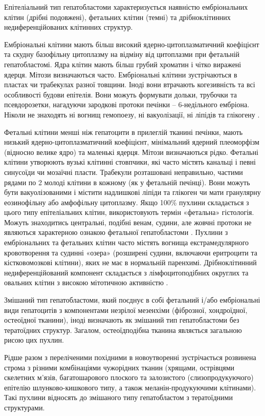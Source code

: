 Епітеліальний тип гепатобластоми характеризується наявністю ембріональних клітин (дрібні подовжені), фетальних клітин (темні) та дрібноклітинних недиференційованих клітинних структур. 

Ембріональні  клітини мають більш високий ядерно-цитоплазматичний коефіцієнт та скудну базофільну цитоплазму на відміну від цитоплазми при фетальній гепатобластомі. Ядра клітин мають більш грубий хроматин і чітко виражені ядерця. Мітози визначаються часто. Ембріональні клітини зустрічаються в пластах чи трабекулах разної товщини. Іноді  вони втрачають когезивність та всі особливості будови епітелія. Вони можуть формувати дольки, трубочки та псевдорозетки, нагадуючи зародкові протоки печінки – 6-недільного ембріона. Ніколи не знаходять ні вогнищ гемопоезу, ні вакуолізації, ні ліпідів та глікогену \cite{pmid20922397}.

Фетальні клітини менші ніж гепатоцити в прилеглій тканині печінки, мають низький ядерно-цитоплазматичний коефіцієнт, мінімальний ядерний плеоморфізм (відносно велике ядро) та маленькі ядерця. Мітози визначаються рідко. Фетальні клітини утворюють вузькі клітинні стовпчики, які часто містять канальці і певні  синусоїди чи мозаїчні пласти. Трабекули розташовані неправильно, частими рядами по 2 молоді клітини в кожному (як у фетальній печінці). Вони можуть бути вакуолізованими і містити надлишкові ліпіди та глікоген чи мати гранулярну еозинофільну або амфофільну цитоплазму. Якщо 100\% пухлини складається з цього типу епітеліальних клітин, використовують термін «фетальна» гістологія. Можуть знаходитись центральні, подібні венам, судини, але жовчні протоки не являються характерною ознакою фетальної гепатобластоми \cite{pmid18970927}.
Пухлини з ембріональних та фетальних клітин часто містять вогнища екстрамедулярного кровотворення та судинні «озера» (розширені судини, включаючи еритроцити та кістковомозкові клітини), яких не має в нормальній паренхимі.
Дрібноклітинний недиференційований компонент складається з лімфоцитоподібних округлих та овальних клітин з високою мітотичною активністю \cite{pmid2544067}.

Змішаний тип гепатобластоми, який  поєднує в собі фетальний  і/або ембріональні види гепатоцитів з компонентами незрілої мезенхіми    (фіброзної, хондроїдної, остеоїдної тканини), іноді визначають як змішаний тип гепатобластоми без тератоїдних структур. Загалом, остеоїдподібна тканина являється загальною рисою цих пухлин.

Рідше разом з переліченими похідними в новоутворенні зустрічається розвинена строма з різними комбінаціями  чужорідних  тканин (хрящами, острівцями скелетних м’язів, багатошарового плоского та залозистого (слизопродукуючого) епітелію шлунково-кишкового типу, а також меланін-продукуючими клітинами). Такі пухлини відносять до змішаного типу гепатобластом з тератоїдними структурами.

